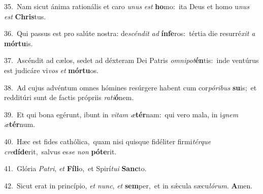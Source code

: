 {\numbfont\textcolor{\numbcolor}{35.}}~Nam sicut ánima rationális et caro \textit{u}\-\textit{nus} \textit{est} \textbf{ho}\-mo:~\star ita Deus et homo u\textit{nus} \textit{est} \textbf{Chris}\-tus.\par
{\numbfont\textcolor{\numbcolor}{36.}}~Qui passus est pro salúte nostra: de\-\textit{scén}\-\textit{dit} \textit{ad} \textbf{ín}\-\textbf{fe}ros:~\star tértia die resurré\textit{xit} \textit{a} \textbf{mór}\-\textbf{tu}is.\par
{\numbfont\textcolor{\numbcolor}{37.}}~Ascéndit ad cælos, sedet ad déxteram Dei Patris \textit{om}\-\textit{ni}\textit{pot}\textbf{én}tis:~\star inde ventúrus est judicáre vi\textit{vos} \textit{et} \textbf{mór}\-\textbf{tu}os.\par
{\numbfont\textcolor{\numbcolor}{38.}}~Ad cujus advéntum omnes hómines resúrgere habent cum cor\-\textit{pó}\-\textit{ri}\textit{bus} \textbf{su}\-is;~\star et redditúri sunt de factis própriis \textit{ra}\-\textit{ti}\textbf{ó}nem.\par
{\numbfont\textcolor{\numbcolor}{39.}}~Et qui bona egérunt, ibunt in \textit{vi}\-\textit{tam} \textit{æ}\-\textbf{tér}nam:~\star qui vero mala, in i\textit{gnem} \textit{æ}\-\textbf{tér}num.\par
{\numbfont\textcolor{\numbcolor}{40.}}~Hæc est fides cathólica,~\dagger quam nisi quisque fidéliter firmi\-\textit{tér}\-\textit{que} \textit{cre}\-\textbf{dí}\textbf{de}rit,~\star salvus es\textit{se} \textit{non} \textbf{pót}\-\textbf{e}rit.\par
{\numbfont\textcolor{\numbcolor}{41.}}~Glória \textit{Pa}\-\textit{tri}, \textit{et} \textbf{Fí}\-\textbf{li}o,~\star et Spirí\-\textit{tu}\-\textit{i} \textbf{Sanc}\-to.\par
{\numbfont\textcolor{\numbcolor}{42.}}~Sicut erat in princípio, \textit{et} \textit{nunc}\-, \textit{et} \textbf{sem}\-per,~\star et in sǽcula sæcu\-\textit{ló}\-\textit{rum}. \textbf{A}\-men.\par

